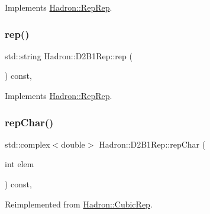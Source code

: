 Implements \mbox{\hyperlink{structHadron_1_1RepRep_ab3213025f6de249f7095892109575fde}{Hadron\+::\+Rep\+Rep}}.

\mbox{\label{structHadron_1_1D2B1Rep_a7ff8b1fc65d3414195a7788bc220b1c0}} 
\subsubsection{\texorpdfstring{rep()}{rep()}\hspace{0.1cm}{\footnotesize\ttfamily [3/3]}}
{\footnotesize\ttfamily std\+::string Hadron\+::\+D2\+B1\+Rep\+::rep (\begin{DoxyParamCaption}{ }\end{DoxyParamCaption}) const\hspace{0.3cm}{\ttfamily [inline]}, {\ttfamily [virtual]}}



Implements \mbox{\hyperlink{structHadron_1_1RepRep_ab3213025f6de249f7095892109575fde}{Hadron\+::\+Rep\+Rep}}.

\mbox{\label{structHadron_1_1D2B1Rep_a306ddfcdbe8144f7f602a2814810cc7f}} 
\subsubsection{\texorpdfstring{repChar()}{repChar()}\hspace{0.1cm}{\footnotesize\ttfamily [1/2]}}
{\footnotesize\ttfamily std\+::complex$<$double$>$ Hadron\+::\+D2\+B1\+Rep\+::rep\+Char (\begin{DoxyParamCaption}\item[{int}]{elem }\end{DoxyParamCaption}) const\hspace{0.3cm}{\ttfamily [inline]}, {\ttfamily [virtual]}}



Reimplemented from \mbox{\hyperlink{structHadron_1_1CubicRep_af45227106e8e715e84b0af69cd3b36f8}{Hadron\+::\+Cubic\+Rep}}.

